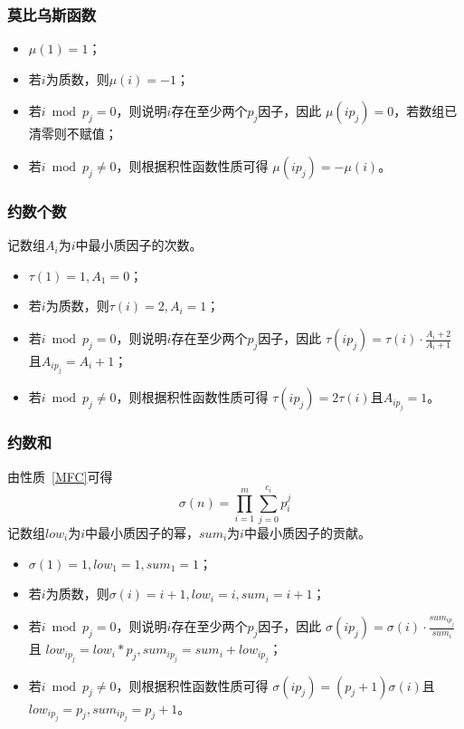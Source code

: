 \subsubsection{莫比乌斯函数}
\begin{itemize}
	\item $\mu(1)=1$；
	\item 若$i$为质数，则$\mu(i)=-1$；
	\item 若$i \bmod p_j=0$，则说明$i$存在至少两个$p_j$因子，因此
	      $\mu(ip_j)=0$，若数组已清零则不赋值；
	\item 若$i \bmod p_j\neq 0$，则根据积性函数性质可得
	      $\mu(ip_j)=-\mu(i)$。
\end{itemize}
\subsubsection{约数个数}
记数组$A_i$为$i$中最小质因子的次数。
\begin{itemize}
	\item $\tau(1)=1,A_1=0$；
	\item 若$i$为质数，则$\tau(i)=2,A_i=1$；
	\item 若$i \bmod p_j=0$，则说明$i$存在至少两个$p_j$因子，因此
	      $\tau(ip_j)=\tau(i)\cdot\frac{A_i+2}{A_i+1}$且$A_{ip_j}=A_i+1$；
	\item 若$i \bmod p_j\neq 0$，则根据积性函数性质可得
	      $\tau(ip_j)=2\tau(i)$且$A_{ip_j}=1$。
\end{itemize}
\subsubsection{约数和}
由性质~\ref{MFC}可得
\begin{displaymath}
	\sigma(n)=\prod_{i=1}^m{\sum_{j=0}^{c_i}{p_i^j}}
\end{displaymath}
记数组$low_i$为$i$中最小质因子的幂，$sum_i$为$i$中最小质因子的贡献。
\begin{itemize}
	\item $\sigma(1)=1,low_1=1,sum_1=1$；
	\item 若$i$为质数，则$\sigma(i)=i+1,low_i=i,sum_i=i+1$；
	\item 若$i \bmod p_j=0$，则说明$i$存在至少两个$p_j$因子，因此
	      $\sigma(ip_j)=\sigma(i)\cdot\frac{sum_{ip_j}}{sum_i}$且
	      $low_{ip_j}=low_i*p_j,sum_{ip_j}=sum_i+low_{ip_j}$；
	\item 若$i \bmod p_j\neq 0$，则根据积性函数性质可得
	      $\sigma(ip_j)=(p_j+1)\sigma(i)$且
	      $low_{ip_j}=p_j,sum_{ip_j}=p_j+1$。
\end{itemize}
